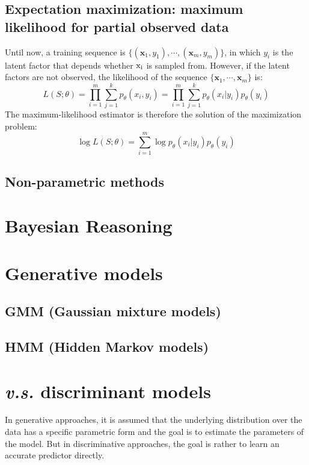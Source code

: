 \documentclass{article}
\begin{document}
	\subsection{Expectation maximization: maximum likelihood for partial observed data}
	Until now, a training sequence is $\{(\bm{x}_1,y_1),\cdots,(\bm{x}_m,y_m)\}$, in which $y_i$ is the latent factor that depends whether $\rm{x}_i$ is sampled from. However, if the latent factors are not observed, the likelihood of the sequence $\{\bm{x}_1,\cdots,\bm{x}_m\}$ is:
	\begin{equation*}
	L(S;\theta) = \prod_{i=1}^m \sum_{j=1}^k p_\theta(x_i,y_i) = \prod_{i=1}^m \sum_{j=1}^k p_\theta(x_i|y_i)p_\theta(y_i)
	\end{equation*}
	The maximum-likelihood estimator is therefore the solution of the maximization problem:
	\begin{equation}
	\log L(S;\theta) = \sum_{i=1}^m \log p_\theta(x_i|y_i)p_\theta(y_i)
	\end{equation}
	\subsection{Non-parametric methods}

\section{Bayesian Reasoning}

\section{Generative models}
	\subsection{GMM (Gaussian mixture models)}
	\subsection{HMM (Hidden Markov models)}

\section{\textit{v.s.} discriminant models}
	\label{sec:final}
	In generative approaches, it is assumed that the underlying distribution over the data has a specific parametric form and the goal is to estimate the parameters of the model. But in discriminative approaches, the goal is rather to learn an accurate predictor directly. 
	
\end{document}
